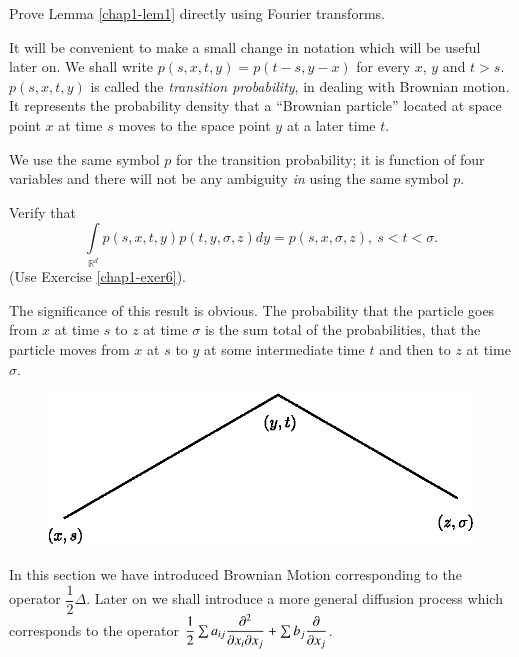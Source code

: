 \begin{exercise}\label{chap1-exer6}
Prove Lemma \ref{chap1-lem1} directly using Fourier transforms.
\end{exercise}

It will be convenient to make a small change in notation which will be
useful later on. We shall write $p(s,x,t,y)=p(t-s,y-x)$ for every $x$,
$y$ and $t>s$. $p(s,x,t,y)$ is called the {\em transition
  probability}, in dealing with Brownian motion. It represents the
probability density that a ``Brownian particle'' located at space
point $x$ at time $s$ moves to the space point $y$ at a later time
$t$.

\begin{note*}
We use the same symbol $p$ for the transition probability; it is
function of four variables and there will not be any ambiguity {\em
  in} using the same symbol $p$.
\end{note*}

\begin{exercise}\label{chap1-exer7}
Verify that
$$
\int\limits_{\mathbb{R}^{d}}p(s,x,t,y)p(t,y,\sigma,z)dy=p(s,x,\sigma,z),
\ s<t<\sigma. 
$$
(Use Exercise \ref{chap1-exer6}).
\end{exercise}

\begin{remark*}
The significance of this result is obvious. The probability that the
particle goes from $x$ at time $s$ to $z$ at time $\sigma$ is the sum
total of the probabilities, that the particle moves from $x$ at $s$ to
$y$ at some intermediate time $t$ and then to $z$ at time $\sigma$.
\begin{figure}[H]
\centering
\includegraphics{figure/fig1.eps}
\end{figure}\pageoriginale

In this section we have introduced Brownian Motion corresponding to
the operator $\dfrac{1}{2}\Delta$. Later on we shall introduce a more
general diffusion process which corresponds to the operator
$\dfrac{1}{2}\sum a_{ij}\dfrac{\partial^{2}}{\partial x_{i}\partial x_{j}}+\sum
b_{j}\dfrac{\partial}{\partial x_{j}}$.
\end{remark*}

